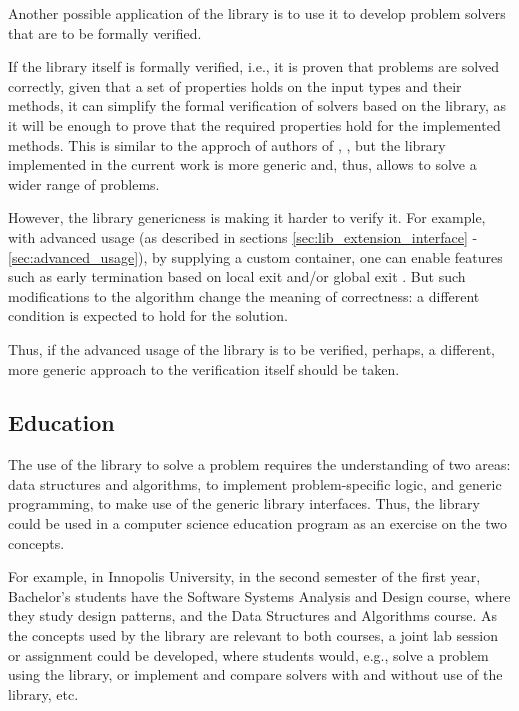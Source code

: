 Another possible application of the library is to use it to develop problem solvers
that are to be formally verified.

If the library itself is formally verified, i.e., it is proven that problems are solved
correctly, given that a set of properties holds on the input types and their methods,
it can simplify the formal verification of solvers based on the library, as it will be
enough to prove that the required properties hold for the implemented methods.
This is similar to the approch
of authors of \cite{narkawicz2013formalnasa}, \cite{smith2015rigorous}, but the library
implemented in the current work is more generic and, thus, allows to solve a wider range
of problems.

However, the library genericness is making it harder to verify it. For example,
with advanced usage (as described in sections
\ref{sec:lib_extension_interface} - \ref{sec:advanced_usage}), by supplying a
custom container, one can enable features such as early termination based on
local exit and/or global exit \cite{narkawicz2013formalnasa}. But such modifications to
the algorithm change the meaning of correctness: a different condition is expected to hold
for the solution.

Thus, if the advanced usage of the library is to be verified, perhaps, a different,
more generic approach to the verification itself should be taken.

\subsection{Education}

The use of the library to solve a problem requires the understanding of two areas:
data structures and algorithms, to implement problem-specific logic,
and generic programming, to make use of the generic library interfaces. Thus, the library
could be used in a computer science education program as an exercise on the two concepts.

For example, in Innopolis University, in the second semester of the first year,
Bachelor's students have the Software Systems Analysis and Design course, where
they study design patterns, and the Data Structures and Algorithms course. As the concepts
used by the library are relevant to both courses, a joint lab session or assignment could be
developed, where students would, e.g., solve a problem using the library, or implement and
compare solvers with and without use of the library, etc.

